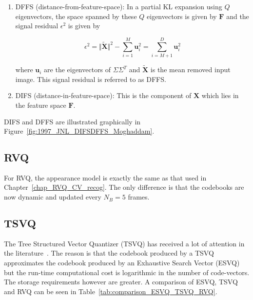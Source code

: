 \begin{enumerate}
\item DFFS (distance-from-feature-space):  In a partial KL expansion using $Q$ eigenvectors, the space spanned by these $Q$ eigenvectors is given by $\mathbf{F}$ and the signal residual $\epsilon^2$ is given by

\begin{equation}
\epsilon^2 = \Vert \tilde{\mathbf{X}} \Vert^2 - \sum\limits_{i=1}^M \mathbf{u}_i^2 = \sum\limits_{i=M+1}^D \mathbf{u}_i^2
\end{equation}

where $\mathbf{u}_i$ are the eigenvectors of $\Sigma\Sigma^T$ and $\tilde{\mathbf{X}}$ is the mean removed input image.  This signal residual is referred to as DFFS.
\item DIFS (distance-in-feature-space):  This is the component of $\mathbf{X}$ which lies in the feature space $\mathbf{F}$.  
\end{enumerate}

DIFS and DFFS are illustrated graphically in Figure~\ref{fig:1997_JNL_DIFSDFFS_Moghaddam}.  

%
%

\subsection{RVQ}
For RVQ, the appearance model is exactly the same as that used in Chapter~\ref{chap_RVQ_CV_recog}.  The only difference is that the codebooks are now dynamic and updated every $N_B=5$ frames. 

\subsection{TSVQ}

The Tree Structured Vector Quantizer (TSVQ) has received a lot of attention in the literature~\cite{1991_BOOK_VQ_GershoGray}.  The reason is that the codebook produced by a TSVQ approximates the codebook produced by an Exhaustive Search Vector (ESVQ) but the run-time computational cost is logarithmic in the number of code-vectors.  The storage requirements however are greater.  A comparison of ESVQ, TSVQ and RVQ can be seen in Table~\ref{tab:comparison_ESVQ_TSVQ_RVQ}.


